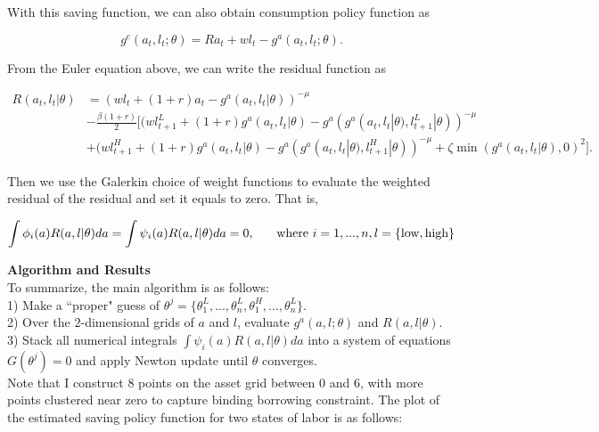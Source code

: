 \documentclass{article}
\begin{document}
	With this saving function, we can also obtain consumption policy function as 
	
	$$g^{c}(a_{t},l_{t};\theta) = Ra_{t} + wl_{t} - g^{a}(a_{t},l_{t};\theta).$$
	
	From the Euler equation above, we can write the residual function as
	
	\begin{align*}
		R(a_{t},l_{t}|\theta) &= (wl_{t} + (1+r)a_{t}-g^{a}(a_{t},l_{t}|\theta))^{-\mu} \\ 
		&- \frac{\beta(1+r)}{2}\Big[ (wl_{t+1}^{L}+(1+r)g^{a}(a_{t},l_{t}|\theta)-g^{a}(g^{a}(a_{t},l_{t}|\theta),l_{t+1}^{L}|\theta))^{-\mu} \\
		&+ (wl_{t+1}^{H}+(1+r)g^{a}(a_{t},l_{t}|\theta)-g^{a}(g^{a}(a_{t},l_{t}|\theta),l_{t+1}^{H}|\theta))^{-\mu} +  \zeta\min(g^{a}(a_{t},l_{t}|\theta),0)^{2} \Big].
	\end{align*}
	
	Then we use the Galerkin choice of weight functions to evaluate the weighted residual of the residual and set it equals to zero. That is,
	
	$$\int\phi_{i}(a)R(a,l|\theta)da = \int\psi_{i}(a)R(a,l|\theta)da = 0, \hspace{0.5cm} \text{ where } i = 1,...,n, l = \{ \text{low}, \text{high}\}$$

	\noindent\textbf{\Large Algorithm and Results} \\
	
	To summarize, the main algorithm is as follows: \\
	
	\hspace{0.5cm} 1) Make a ``proper" guess of $\theta^{j} = \{ \theta_{1}^{L},...,\theta_{n}^{L},\theta_{1}^{H},...,\theta_{n}^{L} \}$.\\
	
	\hspace{0.5cm} 2) Over the $2$-dimensional grids of $a$ and $l$, evaluate $g^{a}(a,l;\theta)$ and $R(a,l|\theta)$. \\
	
	\hspace{0.5cm} 3) Stack all numerical integrals $\int\psi_{i}(a)R(a,l|\theta)da$ into a system of equations $G(\theta^{j}) = 0$ and apply Newton update until $\theta$ converges. \\
	
	Note that I construct $8$ points on the asset grid between $0$ and $6$, with more points clustered near zero to capture binding borrowing constraint. The plot of the estimated saving policy function for two states of labor is as follows:
	
\end{document}
